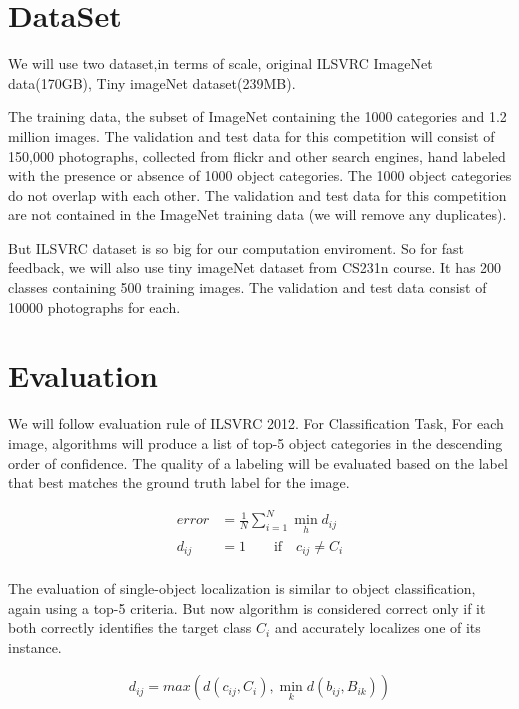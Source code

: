 \documentclass[10pt,twocolumn,letterpaper]{article}
\begin{document}
\section{DataSet}

We will use two dataset,in terms of scale, original ILSVRC ImageNet data(170GB), Tiny imageNet dataset(239MB).

The training data, the subset of ImageNet containing the 1000 categories and 1.2 million images.
The validation and test data for this competition will consist of 150,000 photographs, collected from flickr and other search engines, hand labeled with the presence or absence of 1000 object categories.
The 1000 object categories do not overlap with each other.
The validation and test data for this competition are not contained in the ImageNet training data (we will remove any duplicates).

But ILSVRC dataset is so big for our computation enviroment.
So for fast feedback, we will also use tiny imageNet dataset from CS231n course.
It has 200 classes containing 500 training images.
The validation and test data consist of 10000 photographs for each.

\section{Evaluation}

We will follow evaluation rule of ILSVRC 2012.
For Classification Task, For each image, algorithms will produce a list of top-5 object categories in the descending order of confidence.
The quality of a labeling will be evaluated based on the label that best matches the ground truth label for the image.

\begin{align*}
error &= \frac {1} {N} \sum_{i=1}^{N} {\min_{h} {d_{ij}}} \\
d_{ij} &= 1 \quad\quad \text{if}\quad c_{ij} \neq C_i \\
\end{align*}

The evaluation of single-object localization is similar to object classification, again using a top-5 criteria.
But now algorithm is considered correct only if it both correctly identifies the target class $C_i$ and accurately localizes one of its instance.

\begin{align*}
d_{ij} = max(d(c_{ij}, C_{i}), \min_{k}d(b_{ij}, B_{ik}))
\end{align*}
\end{document}
